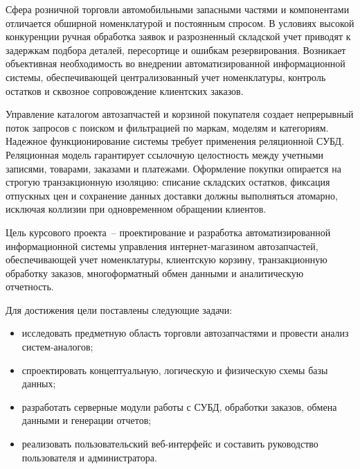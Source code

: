
Сфера розничной торговли автомобильными запасными частями и компонентами отличается обширной номенклатурой и постоянным спросом. В условиях высокой конкуренции ручная обработка заявок и разрозненный складской учет приводят к задержкам подбора деталей, пересортице и ошибкам резервирования. Возникает объективная необходимость во внедрении автоматизированной информационной системы, обеспечивающей централизованный учет номенклатуры, контроль остатков и сквозное сопровождение клиентских заказов.

Управление каталогом автозапчастей и корзиной покупателя создает непрерывный поток запросов с поиском и фильтрацией по маркам, моделям и категориям. Надежное функционирование системы требует применения реляционной СУБД. Реляционная модель гарантирует ссылочную целостность между учетными записями, товарами, заказами и платежами. Оформление покупки опирается на строгую транзакционную изоляцию: списание складских остатков, фиксация отпускных цен и сохранение данных доставки должны выполняться атомарно, исключая коллизии при одновременном обращении клиентов.

Цель курсового проекта~-- проектирование и разработка автоматизированной информационной системы управления интернет-магазином автозапчастей, обеспечивающей учет номенклатуры, клиентскую корзину, транзакционную обработку заказов, многоформатный обмен данными и аналитическую отчетность.

Для достижения цели поставлены следующие задачи:
\begin{itemize}
	\item исследовать предметную область торговли автозапчастями и провести анализ систем-аналогов;
	\item спроектировать концептуальную, логическую и физическую схемы базы данных;
	\item разработать серверные модули работы с СУБД, обработки заказов, обмена данными и генерации отчетов;
	\item реализовать пользовательский веб-интерфейс и составить руководство пользователя и администратора.
\end{itemize}
